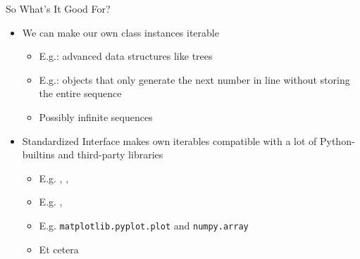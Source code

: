
\begin{frame}{So What's It Good For?}
%
\begin{itemize}
\item We can make our own class instances iterable
	\begin{itemize}
	\item E.\;g.: advanced data structures like trees
	\item E.\;g.: objects that only generate the next number in line without storing the entire sequence
	\item[\Thus] Possibly infinite sequences
	\end{itemize}
\item Standardized Interface makes own iterables compatible with a lot of Python-builtins and third-party libraries
	\begin{itemize}
	\item E.\;g. , , 
	\item E.\;g. , 
	\item E.\;g. \texttt{matplotlib.pyplot.plot} and \texttt{numpy.array}
	\item Et cetera
	\end{itemize}
\end{itemize}
%
\end{frame}


